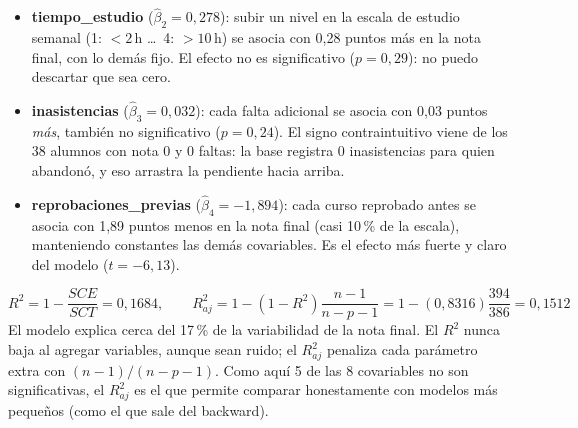 
\begin{itemize}[leftmargin=1.2em]
  \item[\color{cTeal}\faClock] \textbf{tiempo\_estudio} ($\hat\beta_2=0,278$): subir un nivel en la escala de
  estudio semanal (1: $<2$\,h \dots\ 4: $>10$\,h) se asocia con 0,28 puntos más en la nota final, con lo demás
  fijo. El efecto no es significativo ($p=0,29$): no puedo descartar que sea cero.
  \item[\color{cTeal}\faIcon{calendar-times}] \textbf{inasistencias} ($\hat\beta_3=0,032$): cada falta adicional
  se asocia con 0,03 puntos \emph{más}, también no significativo ($p=0,24$). El signo contraintuitivo viene de los
  38 alumnos con nota 0 y 0 faltas: la base registra 0 inasistencias para quien abandonó, y eso arrastra la
  pendiente hacia arriba.
  \item[\color{cRed}\faTimesCircle] \textbf{reprobaciones\_previas} ($\hat\beta_4=-1,894$): cada curso
  reprobado antes se asocia con 1,89 puntos menos en la nota final (casi 10\,\% de la escala), manteniendo
  constantes las demás covariables. Es el efecto más fuerte y claro del modelo ($t=-6,13$).
\end{itemize}

\[
R^2=1-\frac{SCE}{SCT}=0,1684,\qquad
R^2_{aj}=1-(1-R^2)\frac{n-1}{n-p-1}=1-(0,8316)\frac{394}{386}=0,1512
\]
El modelo explica cerca del 17\,\% de la variabilidad de la nota final. El $R^2$ nunca baja al agregar
variables, aunque sean ruido; el $R^2_{aj}$ penaliza cada parámetro extra con $(n-1)/(n-p-1)$. Como aquí
5 de las 8 covariables no son significativas, el $R^2_{aj}$ es el que permite comparar honestamente con
modelos más pequeños (como el que sale del backward).


